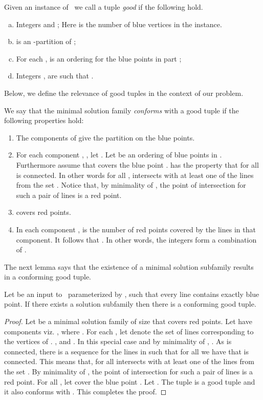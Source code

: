 \begin{definition} \label{goodtuple}Given an instance  of \slrbsc\, we call a tuple 
  {\em good} if the following hold. 
\begin{enumerate}[(a)] 
 \item Integers   and ; Here  is the number of blue vertices in the instance.
 \item  is an -partition of ;
 \item For each ,  is an ordering for the blue points in part ;
 \item Integers , are such that . 
\end{enumerate}
\end{definition}


Below, we define the relevance of good tuples in the context of our problem.
\begin{definition}\label{conforming_tuple}
 We say that the minimal solution family  {\em conforms} with a good tuple 
if the following properties hold:
 \begin{enumerate}
\item The components  of  give the partition  on the blue points.
    \item For each component , , let . Let   be an ordering of blue points in . Furthermore assume that  covers the blue point .  has the property that for all   is connected. In other words for all ,  intersects with at least one of the lines from the set .  Notice that, by minimality of  
     , the point of intersection for such a pair of lines is a red point.  
    
\item  covers  red points.
  \item In each component ,  is the number of red points covered by the lines in that component. It follows that . In other words, the integers  form a combination of .
 \end{enumerate}
\end{definition}

The next lemma says that the existence of a minimal solution subfamily  results in a conforming good tuple. 
\begin{lem}
\label{lem:conformingoodtuplexists}
Let   be an input to  \slrbsc\ parameterized by , such that every line contains exactly  blue point. If there exists a solution subfamily  then there is a conforming good tuple. 
\end{lem}
\begin{proof}
Let  be a minimal solution family of size  that covers  red points. Let  have  components viz. , where . For each , let  denote the set of lines corresponding to the vertices of . ,  and . In this special case and by minimality of , . As  is connected, there is a sequence  for the lines in  such that for all  we have that 
     is connected. This means that, for all   intersects with at least one of the lines from the set . By minimality of , the point of intersection for such a pair of lines is a red point. For all , let  cover the blue point . Let . 
The tuple  is a good tuple and it also conforms with .   This completes the proof.  
\end{proof}



